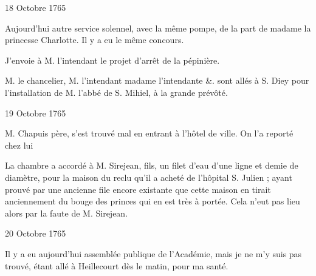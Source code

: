                      \begin{diary}{18 Octobre 1765}{}

                         Aujourd'hui autre service solennel,
                           avec la
                           même pompe, de la part
                           de madame la princesse
                              Charlotte. Il y a eu le même concours. \bigskip


                         J'envoie à M. l'intendant le
                           projet d'arrêt
                           de la pépinière. \bigskip



                           M. le chancelier, M. l'intendant
                           madame l'intendante
                           \&. sont allés à S. Diey pour l'installation
                           de M. l'abbé de S.
                              Mihiel, à la grande prévôté. \bigskip


                     \end{diary}

                     \begin{diary}{19 Octobre 1765}{}


                           M. Chapuis père, s'est trouvé
                           mal en entrant
                           à l'hôtel de ville. On l'a
                           reporté chez lui \bigskip


                         La chambre a accordé à M. Sirejean,
                              fils, un
                           filet d'eau d'une ligne et demie de diamètre,
                           pour la maison du reclu qu'il a acheté de l'hôpital
                              S. Julien ; ayant prouvé par une ancienne file
                           encore existante que cette maison en tirait
                           anciennement du bouge des princes qui en est
                           très à portée. Cela n'eut pas lieu alors par
                           la faute de M. Sirejean. \bigskip


                     \end{diary}

                     \begin{diary}{20 Octobre 1765}{}

                         Il y a eu aujourd'hui assemblée publique
                           de
                           l'Académie, mais je ne m'y
                           suis pas trouvé, étant allé à Heillecourt dès le
                           matin, pour ma santé. \bigskip


                     \end{diary}


